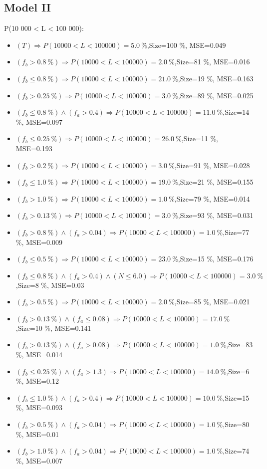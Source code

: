 \documentclass[numbered]{CSL}
\begin{document}
\subsection{Model II}
P(10 000 < L < 100 000):
\begin{itemize}
\item $(T) \Rightarrow P(10 000 < L < 100 000) = 5.0~\%$,\hfill Size=100 \%, MSE=0.049
\item $(f_b > 0.8~\%) \Rightarrow P(10 000 < L < 100 000) = 2.0~\%$,\hfill Size=81 \%, MSE=0.016
\item $(f_b \leq 0.8~\%) \Rightarrow P(10 000 < L < 100 000) = 21.0~\%$,\hfill Size=19 \%, MSE=0.163
\item $(f_b > 0.25~\%) \Rightarrow P(10 000 < L < 100 000) = 3.0~\%$,\hfill Size=89 \%, MSE=0.025
\item $(f_b \leq 0.8~\%) \land (f_a > 0.4) \Rightarrow P(10 000 < L < 100 000) = 11.0~\%$,\hfill Size=14 \%, MSE=0.097
\item $(f_b \leq 0.25~\%) \Rightarrow P(10 000 < L < 100 000) = 26.0~\%$,\hfill Size=11 \%, MSE=0.193
\item $(f_b > 0.2~\%) \Rightarrow P(10 000 < L < 100 000) = 3.0~\%$,\hfill Size=91 \%, MSE=0.028
\item $(f_b \leq 1.0~\%) \Rightarrow P(10 000 < L < 100 000) = 19.0~\%$,\hfill Size=21 \%, MSE=0.155
\item $(f_b > 1.0~\%) \Rightarrow P(10 000 < L < 100 000) = 1.0~\%$,\hfill Size=79 \%, MSE=0.014
\item $(f_b > 0.13~\%) \Rightarrow P(10 000 < L < 100 000) = 3.0~\%$,\hfill Size=93 \%, MSE=0.031
\item $(f_b > 0.8~\%) \land (f_a > 0.04) \Rightarrow P(10 000 < L < 100 000) = 1.0~\%$,\hfill Size=77 \%, MSE=0.009
\item $(f_b \leq 0.5~\%) \Rightarrow P(10 000 < L < 100 000) = 23.0~\%$,\hfill Size=15 \%, MSE=0.176
\item $(f_b \leq 0.8~\%) \land (f_a > 0.4) \land (N \leq 6.0) \Rightarrow P(10 000 < L < 100 000) = 3.0~\%$,\hfill Size=8 \%, MSE=0.03
\item $(f_b > 0.5~\%) \Rightarrow P(10 000 < L < 100 000) = 2.0~\%$,\hfill Size=85 \%, MSE=0.021
\item $(f_b > 0.13~\%) \land (f_a \leq 0.08) \Rightarrow P(10 000 < L < 100 000) = 17.0~\%$,\hfill Size=10 \%, MSE=0.141
\item $(f_b > 0.13~\%) \land (f_a > 0.08) \Rightarrow P(10 000 < L < 100 000) = 1.0~\%$,\hfill Size=83 \%, MSE=0.014
\item $(f_b \leq 0.25~\%) \land (f_a > 1.3) \Rightarrow P(10 000 < L < 100 000) = 14.0~\%$,\hfill Size=6 \%, MSE=0.12
\item $(f_b \leq 1.0~\%) \land (f_a > 0.4) \Rightarrow P(10 000 < L < 100 000) = 10.0~\%$,\hfill Size=15 \%, MSE=0.093
\item $(f_b > 0.5~\%) \land (f_a > 0.04) \Rightarrow P(10 000 < L < 100 000) = 1.0~\%$,\hfill Size=80 \%, MSE=0.01
\item $(f_b > 1.0~\%) \land (f_a > 0.04) \Rightarrow P(10 000 < L < 100 000) = 1.0~\%$,\hfill Size=74 \%, MSE=0.007
\end{itemize}
\end{document}

